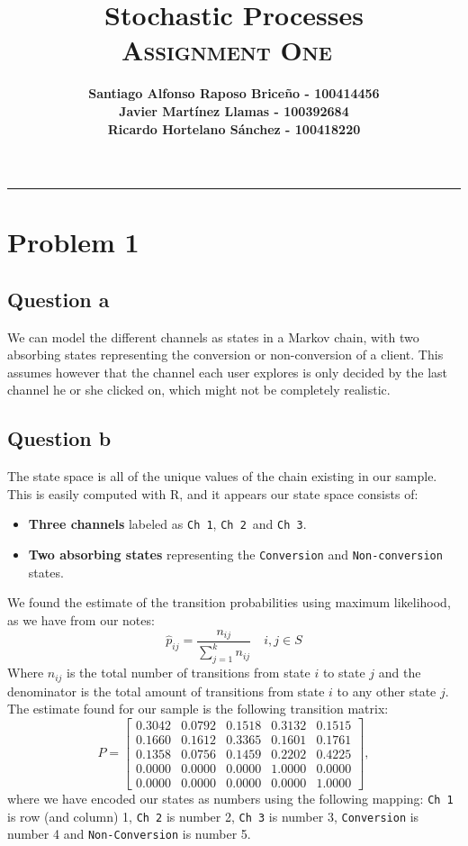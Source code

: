 \documentclass[11pt, a4paper]{article}
\title{\vspace{-8ex} \huge \bfseries Stochastic Processes\\
	\LARGE \normalfont \textsc{Assignment One} \vspace{-2ex}}
\author{\bfseries Santiago Alfonso Raposo Briceño - 100414456 \\
		\bfseries Javier Martínez Llamas - 100392684\\
		\bfseries Ricardo Hortelano Sánchez - 100418220}
\date{\vspace{-5ex}} %
\begin{document}
\maketitle
\hrule

\section{Problem 1}

\subsection{Question a}
We can model the different channels as states in a Markov chain, with two absorbing states representing the conversion or non-conversion of a client.
This assumes however that the channel each user explores is only decided by the last channel he or she clicked on, which might not be completely realistic.

\subsection{Question b}
The state space is all of the unique values of the chain existing in our sample. This is easily computed with R, and it appears our state space consists of:
\begin{itemize}
	\item \textbf{Three channels} labeled as \verb|Ch 1|, \verb|Ch 2| and \verb|Ch 3|.
	\item \textbf{Two absorbing states} representing the \verb|Conversion| and \verb|Non-conversion| states.
\end{itemize}

We found the estimate of the transition probabilities using maximum likelihood, as we have from our notes:
\[
	\hat p_{ij} = \frac{n_{ij}}{\sum_{j = 1}^{k}n_{ij}} \quad i,j \in S
\]
Where $n_{ij}$ is the total number of transitions from state $i$ to state $j$ and the denominator is the total amount of transitions from state $i$ to any other state $j$.
The estimate found for our sample is the following transition matrix:
\[
 P = \begin{bmatrix}
 	0.3042 & 0.0792 & 0.1518 & 0.3132 & 0.1515 \\
 	0.1660 & 0.1612 & 0.3365 & 0.1601 & 0.1761 \\
 	0.1358 & 0.0756 & 0.1459 & 0.2202 & 0.4225 \\
 	0.0000 & 0.0000 & 0.0000 & 1.0000 & 0.0000 \\
 	0.0000 & 0.0000 & 0.0000 & 0.0000 & 1.0000
 \end{bmatrix},
\]
where we have encoded our states as numbers using the following mapping: \verb|Ch 1| is row (and column) 1, \verb|Ch 2| is number 2, \verb|Ch 3| is number 3, \verb|Conversion| is number 4 and \verb|Non-Conversion| is number 5.
\end{document}
